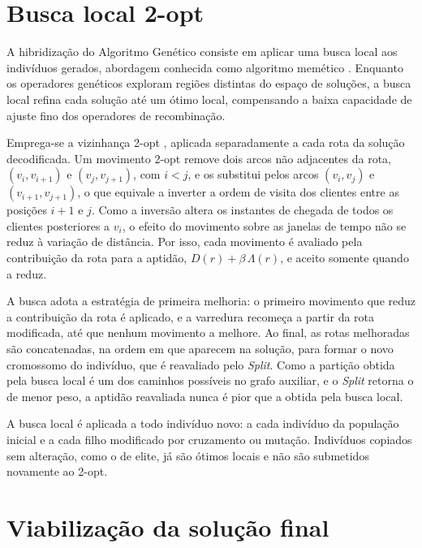 \section{Busca local 2-opt}
\label{sec:buscalocal}

A hibridização do Algoritmo Genético consiste em aplicar uma busca local aos indivíduos
gerados, abordagem conhecida como algoritmo memético \cite{moscato1989}. Enquanto os
operadores genéticos exploram regiões distintas do espaço de soluções, a busca local
refina cada solução até um ótimo local, compensando a baixa capacidade de ajuste fino
dos operadores de recombinação.

Emprega-se a vizinhança 2-opt \cite{croes1958}, aplicada separadamente a cada rota da
solução decodificada. Um movimento 2-opt remove dois arcos não adjacentes da rota,
$(v_i, v_{i+1})$ e $(v_j, v_{j+1})$, com $i < j$, e os substitui pelos arcos $(v_i,
v_j)$ e $(v_{i+1}, v_{j+1})$, o que equivale a inverter a ordem de visita dos clientes
entre as posições $i+1$ e $j$. Como a inversão altera os instantes de chegada de todos
os clientes posteriores a $v_i$, o efeito do movimento sobre as janelas de tempo não se
reduz à variação de distância. Por isso, cada movimento é avaliado pela contribuição da
rota para a aptidão, $D(r) + \beta \, \Lambda(r)$, e aceito somente quando a reduz.

A busca adota a estratégia de primeira melhoria: o primeiro movimento que reduz a
contribuição da rota é aplicado, e a varredura recomeça a partir da rota modificada,
até que nenhum movimento a melhore. Ao final, as rotas melhoradas são concatenadas, na
ordem em que aparecem na solução, para formar o novo cromossomo do indivíduo, que é
reavaliado pelo \textit{Split}. Como a partição obtida pela busca local é um dos
caminhos possíveis no grafo auxiliar, e o \textit{Split} retorna o de menor peso, a
aptidão reavaliada nunca é pior que a obtida pela busca local.

A busca local é aplicada a todo indivíduo novo: a cada indivíduo da população inicial e
a cada filho modificado por cruzamento ou mutação. Indivíduos copiados sem alteração,
como o de elite, já são ótimos locais e não são submetidos novamente ao 2-opt.

\section{Viabilização da solução final}
\label{sec:viabilizacao}

